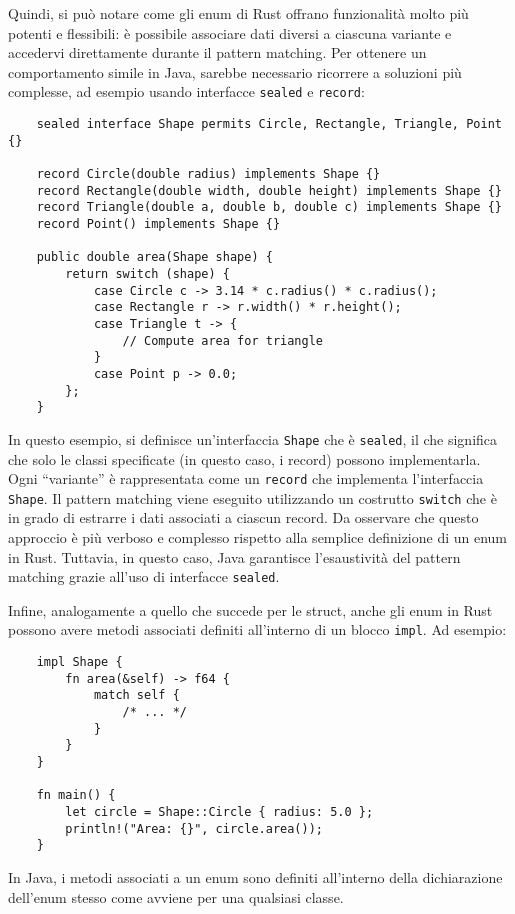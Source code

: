 Quindi, si può notare come gli enum di Rust offrano funzionalità molto più potenti e flessibili: è possibile associare dati diversi a ciascuna variante e accedervi direttamente durante il pattern matching. Per ottenere un comportamento simile in Java, sarebbe necessario ricorrere a soluzioni più complesse, ad esempio usando interfacce \texttt{sealed} e \texttt{record}:
\begin{verbatim}
    sealed interface Shape permits Circle, Rectangle, Triangle, Point {}

    record Circle(double radius) implements Shape {}
    record Rectangle(double width, double height) implements Shape {}
    record Triangle(double a, double b, double c) implements Shape {}
    record Point() implements Shape {}

    public double area(Shape shape) {
        return switch (shape) {
            case Circle c -> 3.14 * c.radius() * c.radius();
            case Rectangle r -> r.width() * r.height();
            case Triangle t -> {
                // Compute area for triangle
            }
            case Point p -> 0.0;
        };
    }
\end{verbatim}
In questo esempio, si definisce un'interfaccia \texttt{Shape} che è \texttt{sealed}, il che significa che solo le classi specificate (in questo caso, i record) possono implementarla. Ogni ``variante'' è rappresentata come un \texttt{record} che implementa l'interfaccia \texttt{Shape}. Il pattern matching viene eseguito utilizzando un costrutto \texttt{switch} che è in grado di estrarre i dati associati a ciascun record. Da osservare che questo approccio è più verboso e complesso rispetto alla semplice definizione di un enum in Rust. Tuttavia, in questo caso, Java garantisce l'esaustività del pattern matching grazie all'uso di interfacce \texttt{sealed}.

Infine, analogamente a quello che succede per le struct, anche gli enum in Rust possono avere metodi associati definiti all'interno di un blocco \texttt{impl}. Ad esempio:
\begin{verbatim}
    impl Shape {
        fn area(&self) -> f64 {
            match self {
                /* ... */
            }
        }
    }

    fn main() {
        let circle = Shape::Circle { radius: 5.0 };
        println!("Area: {}", circle.area());
    }
\end{verbatim}
In Java, i metodi associati a un enum sono definiti all'interno della dichiarazione dell'enum stesso come avviene per una qualsiasi classe.